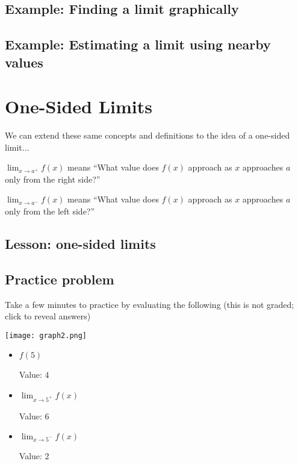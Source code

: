 \documentclass{ximera}
\begin{document}
\subsection{Example: Finding a limit graphically}
\begin{center}
\end{center}

\subsection{Example: Estimating a limit using nearby values}
\begin{center}
\end{center}

\section{One-Sided Limits}

We can extend these same concepts and definitions to the idea of a one-sided limit...

$\lim_{x \to a^+} f(x)$ means ``What value does $f(x)$ approach as $x$ approaches $a$ only from the right side?''

$\lim_{x \to a^-} f(x)$ means ``What value does $f(x)$ approach as $x$ approaches $a$ only from the left side?''

\subsection{Lesson: one-sided limits}

\begin{center}
\end{center}

\subsection{Practice problem}

Take a few minutes to practice by evaluating the following (this is not graded; click to reveal answers)

\texttt{[image: graph2.png]}

\begin{itemize}
    \item $f(5)$
    \begin{expandable}
        Value: $4$
    \end{expandable}
    \item $\lim_{x\to5^+} f(x)$
    \begin{foldable}
        Value: $6$
    \end{foldable}
    \item $\lim_{x\to5^-} f(x)$
    \begin{expandable}
        Value: $2$
    \end{expandable}
\end{itemize}
\end{document}
